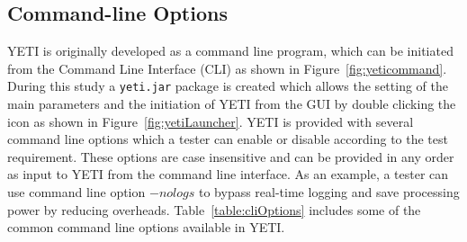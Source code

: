 \bigskip
\bigskip

\subsection{Command-line Options}
YETI is originally developed as a command line program, which can be initiated from the Command Line Interface (CLI) as shown in Figure~\ref{fig:yeticommand}. During this study a \verb+yeti.jar+ package is created which allows the setting of the main parameters and the initiation of YETI from the GUI by double clicking the icon as shown in Figure~\ref{fig:yetiLauncher}. YETI is provided with several command line options which a tester can enable or disable according to the test requirement. These options are case insensitive and can be provided in any order as input to YETI from the command line interface. As an example, a tester can use command line option $-nologs$ to bypass real-time logging and save processing power by reducing overheads. Table~\ref{table:cliOptions} includes some of the common command line options available in YETI.

